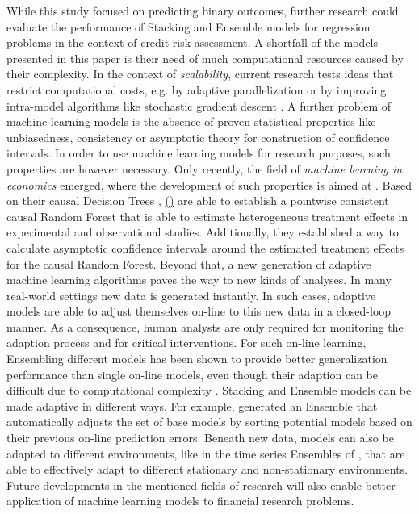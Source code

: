 \documentclass[12pt]{article}
\begin{document}
While this study focused on predicting binary outcomes, further research could evaluate the performance of Stacking and Ensemble models for regression problems in the context of credit risk assessment. A shortfall of the models presented in this paper is their need of much computational resources caused by their complexity. In the context of \textit{scalability}, current research tests ideas that restrict computational costs, e.g. by adaptive parallelization \citep{li2014communication} or by improving intra-model algorithms like stochastic gradient descent \citep{bottou2012stochastic}. A further problem of machine learning models is the absence of proven statistical properties like unbiasedness, consistency or asymptotic theory for construction of confidence intervals. In order to use machine learning models for research purposes, such properties are however necessary. Only recently, the field of \textit{machine learning in economics} emerged, where the development of such properties is aimed at \citep[cp.][]{athey2017impact}. Based on their causal Decision Trees \citep{athey2015machine}, \citeauthor{wager2018est} \hyperlink{wager2018est}{(\color{Black}{in press})} are able to establish a pointwise consistent causal Random Forest that is able to estimate heterogeneous treatment effects in experimental and observational studies. Additionally, they established a way to calculate asymptotic confidence intervals around the estimated treatment effects for the causal Random Forest. Beyond that, a new generation of adaptive machine learning algorithms paves the way to new kinds of analyses. In many real-world settings new data is generated instantly. In such cases, adaptive models are able to adjust themselves on-line to this new data in a closed-loop manner. As a consequence, human analysts are only required for monitoring the adaption process and for critical interventions. For such on-line learning, Ensembling different models has been shown to provide better generalization performance than single on-line models, even though their adaption can be difficult due to computational complexity \citep[p.1-6]{soares2016adaptive}. Stacking and Ensemble models can be made adaptive in different ways. For example, \cite{soares2016adaptive} generated an Ensemble that automatically adjusts the set of base models by sorting potential models based on their previous on-line prediction errors. Beneath new data, models can also be adapted to different environments, like in the time series Ensembles of \cite{van2009adaptive}, that are able to effectively adapt to different stationary and non-stationary environments. Future developments in the mentioned fields of research will also enable better application of machine learning models to financial research problems.
\end{document}
